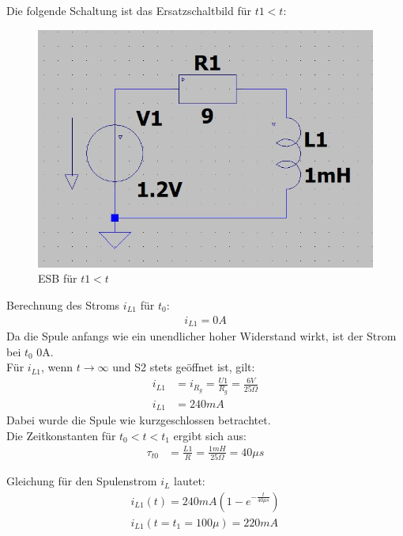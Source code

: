 \documentclass{article}
\begin{document}
Die folgende Schaltung ist das Ersatzschaltbild für $t1 < t$:
\begin{figure}[h]
  \begin{center}
    \includegraphics[scale=0.3]{../assets/images/ET2P5/t1 kleiner t.JPG}
    \caption{ESB für $t1 < t$ }
  \end{center}
\end{figure}
\newpage

Berechnung des Stroms $i_{L1}$ für $t_0$:
\begin{align*}
  i_{L1} = 0A
\end{align*}
Da die Spule anfangs wie ein unendlicher hoher Widerstand wirkt, ist der Strom bei $t_0$ 0A.\\


Für $i_{L1}$, wenn $t \rightarrow \infty$ und S2 stets geöffnet ist, gilt:
\begin{align*}
  i_{L1}&= i_{R_g} = \frac{U1}{R_g} = \frac{6V}{25\Omega}\\
  i_{L1}&= 240mA
\end{align*}
Dabei wurde die Spule wie kurzgeschlossen betrachtet. \\

Die Zeitkonstanten für $t_0 < t < t_1$ ergibt sich aus:
\begin{align*}
  \tau_{t0} &= \frac{L1}{R} = \frac{1mH}{25\Omega}=40\mu s
\end{align*}

Gleichung für den Spulenstrom $i_L$ lautet:
\begin{align*}
  i_{L1}(t) = 240mA (1 - e^{-\frac{t}{40\mu s}})\\
  i_{L1}(t=t_1=100\mu) = 220mA
\end{align*}
\end{document}
